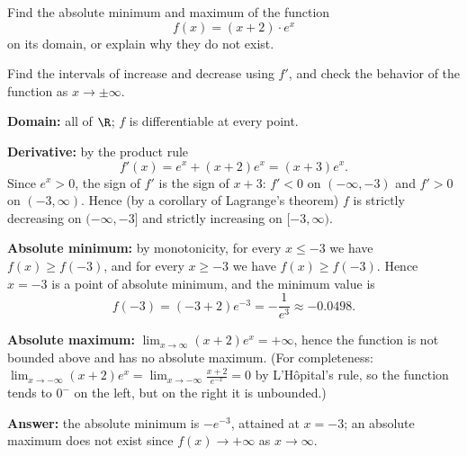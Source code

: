 
\begin{question}
Find the absolute minimum and maximum of the function
\[ f(x)=(x+2)\cdot e^x \]
on its domain, or explain why they do not exist.
\end{question}

\begin{hint}
Find the intervals of increase and decrease using $f'$, and check the behavior of the function as $x\to\pm\infty$.
\end{hint}

\begin{solution}
\textbf{Domain:} all of $\R$; $f$ is differentiable at every point.

\textbf{Derivative:} by the product rule
\[ f'(x)=e^x+(x+2)e^x=(x+3)e^x. \]
Since $e^x>0$, the sign of $f'$ is the sign of $x+3$: $f'<0$ on $(-\infty,-3)$ and $f'>0$ on $(-3,\infty)$. Hence (by a corollary of Lagrange's theorem) $f$ is strictly decreasing on $(-\infty,-3]$ and strictly increasing on $[-3,\infty)$.

\textbf{Absolute minimum:} by monotonicity, for every $x\le-3$ we have $f(x)\ge f(-3)$, and for every $x\ge-3$ we have $f(x)\ge f(-3)$. Hence $x=-3$ is a point of absolute minimum, and the minimum value is
\[ f(-3)=(-3+2)e^{-3}=-\frac1{e^3}\approx-0.0498. \]

\textbf{Absolute maximum:} $\lim_{x\to\infty}(x+2)e^x=+\infty$, hence the function is not bounded above and has no absolute maximum. (For completeness: $\lim_{x\to-\infty}(x+2)e^x=\lim_{x\to-\infty}\frac{x+2}{e^{-x}}=0$ by L'Hôpital's rule, so the function tends to $0^-$ on the left, but on the right it is unbounded.)

\textbf{Answer:} the absolute minimum is $-e^{-3}$, attained at $x=-3$; an absolute maximum does not exist since $f(x)\to+\infty$ as $x\to\infty$.
\end{solution}
